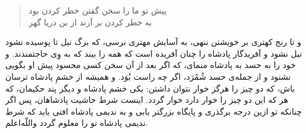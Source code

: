 \begin{quote}
پيش تو ما را سخن گفتن خطر كردن بود\\ 
به خطر كردن بر آرند از بن دريا گهر
\end{quote}
و تا رنج كهترى بر خويشتن ننهى، به آسايش مهترى نرسى، كه برگ نيل تا پوسيده نشود نيل نشود و آفريدگار پادشاه را چنان آفريده است كه همه را بيند كه به وِى حاجتمندند. و خود را به حسد به پادشاه منماى، كه اگر بعد از آن سخن كسى محسود پيش او بگويى نشنود و از جمله‌ی حسد شُمُرَد، اگر چه راست بُوَد. و هميشه از خشمِ پادشاه ترسان باش، كه دو چيز را هرگز خوار نتوان داشتن: يكى خشم پادشاه و ديگر پند حكيمان، كه هر كه اين دو چيز را خوار دارد خوار گردد. اينست شرط حاشيت پادشاهان، پس اگر چنانكه تو ازين درجه برگذرى و پايگاه بزرگتر يابى و به نديمى پادشاه افتى بايد كه شرط نديمى پادشاه تو را معلوم گردد واللّه‌اعلم.


















 
